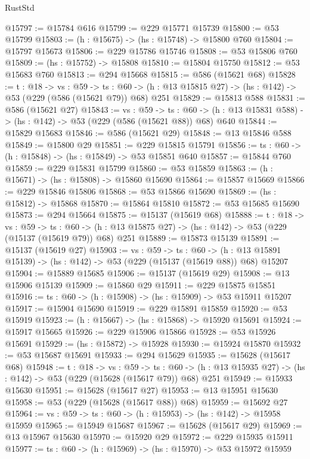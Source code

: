 \begin{lexlean}{RustStd}
\begin{coremodule}
@15797 := @15784 @616
@15799 := @229 @15771 @15739
@15800 := @53 @15799
@15803 := (h : @15675) -> (hs : @15748) -> @15800 @760
@15804 := @15797 @15673
@15806 := @229 @15786 @15746
@15808 := @53 @15806 @760
@15809 := (hs : @15752) -> @15808
@15810 := @15804 @15750
@15812 := @53 @15683 @760
@15813 := @294 @15668
@15815 := @586 (@15621 @68)
@15828 := {t : @18} ->
  {vs : @59} ->
  {ts : @60} -> (h : @13 @15815 @27) -> (hs : @142) -> @53 (@229 (@586 (@15621 @79)) @68) @251
@15829 := @15813 @588
@15831 := @586 (@15621 @27)
@15843 := {vs : @59} ->
  {ts : @60} -> (h : @13 @15831 @588) -> (hs : @142) -> @53 (@229 (@586 (@15621 @88)) @68) @640
@15844 := @15829 @15683
@15846 := @586 (@15621 @29)
@15848 := @13 @15846 @588
@15849 := @15800 @29
@15851 := @229 @15815 @15791
@15856 := {ts : @60} -> (h : @15848) -> (hs : @15849) -> @53 @15851 @640
@15857 := @15844 @760
@15859 := @229 @15831 @15799
@15860 := @53 @15859
@15863 := (h : @15671) -> (hs : @15808) -> @15860 @15690
@15864 := @15857 @15669
@15866 := @229 @15846 @15806
@15868 := @53 @15866 @15690
@15869 := (hs : @15812) -> @15868
@15870 := @15864 @15810
@15872 := @53 @15685 @15690
@15873 := @294 @15664
@15875 := @15137 (@15619 @68)
@15888 := {t : @18} ->
  {vs : @59} ->
  {ts : @60} -> (h : @13 @15875 @27) -> (hs : @142) -> @53 (@229 (@15137 (@15619 @79)) @68) @251
@15889 := @15873 @15139
@15891 := @15137 (@15619 @27)
@15903 := {vs : @59} ->
  {ts : @60} ->
  (h : @13 @15891 @15139) -> (hs : @142) -> @53 (@229 (@15137 (@15619 @88)) @68) @15207
@15904 := @15889 @15685
@15906 := @15137 (@15619 @29)
@15908 := @13 @15906 @15139
@15909 := @15860 @29
@15911 := @229 @15875 @15851
@15916 := {ts : @60} -> (h : @15908) -> (hs : @15909) -> @53 @15911 @15207
@15917 := @15904 @15690
@15919 := @229 @15891 @15859
@15920 := @53 @15919
@15923 := (h : @15667) -> (hs : @15868) -> @15920 @15691
@15924 := @15917 @15665
@15926 := @229 @15906 @15866
@15928 := @53 @15926 @15691
@15929 := (hs : @15872) -> @15928
@15930 := @15924 @15870
@15932 := @53 @15687 @15691
@15933 := @294 @15629
@15935 := @15628 (@15617 @68)
@15948 := {t : @18} ->
  {vs : @59} ->
  {ts : @60} -> (h : @13 @15935 @27) -> (hs : @142) -> @53 (@229 (@15628 (@15617 @79)) @68) @251
@15949 := @15933 @15630
@15951 := @15628 (@15617 @27)
@15953 := @13 @15951 @15630
@15958 := @53 (@229 (@15628 (@15617 @88)) @68)
@15959 := @15692 @27
@15964 := {vs : @59} -> {ts : @60} -> (h : @15953) -> (hs : @142) -> @15958 @15959
@15965 := @15949 @15687
@15967 := @15628 (@15617 @29)
@15969 := @13 @15967 @15630
@15970 := @15920 @29
@15972 := @229 @15935 @15911
@15977 := {ts : @60} -> (h : @15969) -> (hs : @15970) -> @53 @15972 @15959

\end{coremodule}
\end{lexlean}
